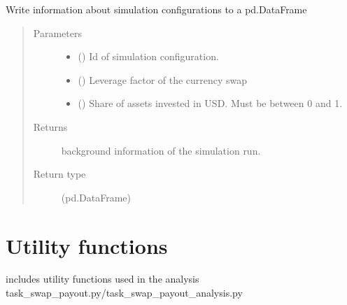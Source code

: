 \documentclass[a4paper,11pt,english]{sphinxmanual}
\begin{document}

\begin{fulllineitems}
\label{\detokenize{simulation_analysis:src.simulation_analysis.task_swap_payout.filename_to_metadata}}
\sphinxAtStartPar
Write information about simulation configurations to a pd.DataFrame
\begin{quote}\begin{description}
\item[{Parameters}] \leavevmode\begin{itemize}
\item {} 
\sphinxAtStartPar
{} () \textendash{} Id of simulation configuration.

\item {} 
\sphinxAtStartPar
{} () \textendash{} Leverage factor of the currency swap

\item {} 
\sphinxAtStartPar
{} () \textendash{} Share of assets invested in USD. Must be between 0 and 1.

\end{itemize}

\item[{Returns}] \leavevmode
\sphinxAtStartPar
background information of the simulation run.

\item[{Return type}] \leavevmode
\sphinxAtStartPar
(pd.DataFrame)

\end{description}\end{quote}

\end{fulllineitems}



\section{Utility functions}
\label{\detokenize{simulation_analysis:module-src.simulation_analysis.utility}}\label{\detokenize{simulation_analysis:utility-functions}}
\sphinxAtStartPar
includes utility functions
used in the analysis task\_swap\_payout.py/task\_swap\_payout\_analysis.py
\end{document}
